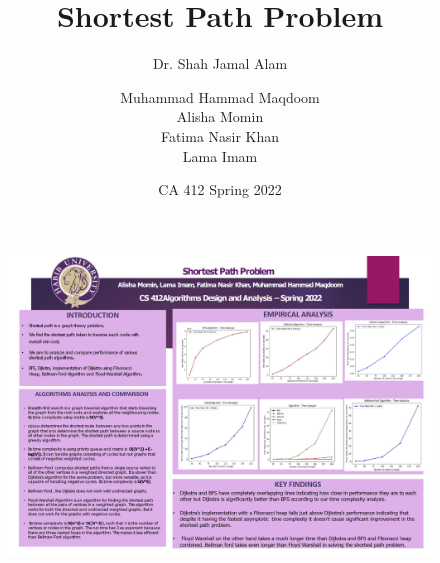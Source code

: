 \documentclass{beamer}
\title{Shortest Path Problem}
\subtitle{Dr. Shah Jamal Alam}
\author{Muhammad Hammad Maqdoom \\ Alisha Momin \\ Fatima Nasir Khan \\ Lama Imam}
\date{CA 412 Spring 2022}
\begin{document}
\maketitle

\begin{figure}
          \centering
          \includegraphics[width=12cm]{images/poster.png}
    \end{figure}  
\end{document}
